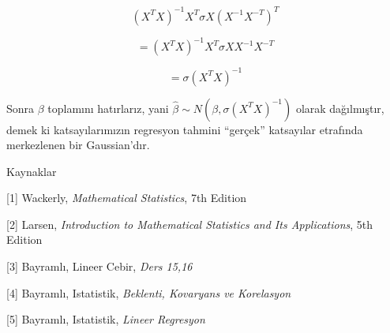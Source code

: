 \documentclass[12pt,fleqn]{article}\usepackage{../../common}
\begin{document}
$$ (X^TX)^{-1}X^T \sigma X(X^{-1}X^{-T})^{T}  $$

$$ = (X^TX)^{-1}X^T \sigma X X^{-1}X^{-T}  $$

$$ = \sigma (X^TX)^{-1}  $$

Sonra $\beta$ toplamını hatırlarız, yani $\hat{\beta} \sim N(\beta, \sigma
(X^TX)^{-1} )$ olarak dağılmıştır, demek ki katsayılarımızın regresyon 
tahmini ``gerçek'' katsayılar etrafında  merkezlenen bir Gaussian'dır.

Kaynaklar

[1] Wackerly, {\em Mathematical Statistics}, 7th Edition

[2] Larsen, {\em Introduction to Mathematical Statistics and Its Applications}, 5th Edition

[3] Bayramlı, Lineer Cebir, {\em Ders 15,16}

[4] Bayramlı, Istatistik, {\em Beklenti, Kovaryans ve Korelasyon} 

[5] Bayramlı, Istatistik, {\em Lineer Regresyon}
\end{document}
